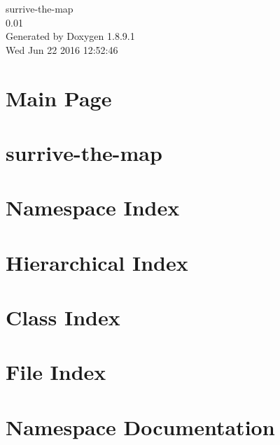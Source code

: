 \documentclass[twoside]{book}
\newcommand{\+}{\discretionary{\mbox{\scriptsize$\hookleftarrow$}}{}{}}
\newcommand{\clearemptydoublepage}{%
  \newpage{\pagestyle{empty}\cleardoublepage}%
}
\begin{document}
\hypersetup{pageanchor=false,
             bookmarks=true,
             bookmarksnumbered=true,
             pdfencoding=unicode
            }
\begin{titlepage}
\vspace*{7cm}
\begin{center}%
{\Large surrive-\/the-\/map \\[1ex]\large 0.\+01 }\\
\vspace*{1cm}
{\large Generated by Doxygen 1.8.9.1}\\
\vspace*{0.5cm}
{\small Wed Jun 22 2016 12:52:46}\\
\end{center}
\end{titlepage}
\clearemptydoublepage
\tableofcontents
\clearemptydoublepage
{}
\hypersetup{pageanchor=true}

\chapter{Main Page}
\label{index}\hypertarget{index}{}
\chapter{surrive-\/the-\/map}
\label{md__c_1__users__foto__documents__git_hub_surrive-the-map__r_e_a_d_m_e}
\hypertarget{md__c_1__users__foto__documents__git_hub_surrive-the-map__r_e_a_d_m_e}{}

\chapter{Namespace Index}

\chapter{Hierarchical Index}

\chapter{Class Index}

\chapter{File Index}

\chapter{Namespace Documentation}

\end{document}
